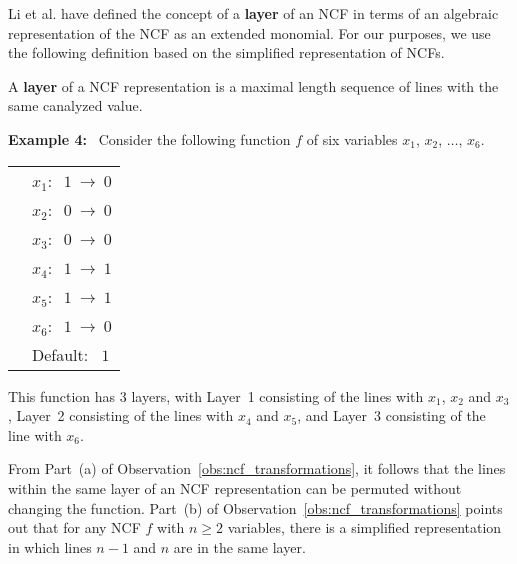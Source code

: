 \noindent
Li et al. \cite{Li-etal-2013} have defined the concept of a 
{\bf layer} of an NCF in terms of
an algebraic representation of the NCF as an extended monomial.
For our purposes, we use the following definition based on the
simplified representation of NCFs.

\begin{definition}
\label{def:layer}
A {\bf layer} of a NCF representation is a maximal length sequence 
of lines with the same canalyzed value.
\end{definition}

\noindent
\textbf{Example 4:}~ Consider the following function $f$ of six variables
$x_1$, $x_2$, $\ldots$, $x_6$. 

\bigskip

\noindent
\begin{tabular}{ll}
\hspace*{1.1in} & $x_1:~$  $1 ~\longrightarrow~ 0$ \\ [0.5ex]
\hspace*{1.1in} & $x_2:~$  $0 ~\longrightarrow~ 0$ \\ [0.5ex]
\hspace*{1.1in} & $x_3:~$  $0 ~\longrightarrow~ 0$ \\ [0.5ex]
\hspace*{1.1in} & $x_4:~$  $1 ~\longrightarrow~ 1$ \\ [0.5ex]
\hspace*{1.1in} & $x_5:~$  $1 ~\longrightarrow~ 1$ \\ [0.5ex]
\hspace*{1.1in} & $x_6:~$  $1 ~\longrightarrow~ 0$ \\ [0.5ex]
\hspace*{1.1in} & Default:~ $1$ \\
\end{tabular}

\medskip
\noindent
This function has 3 layers, with 
Layer~1 consisting of the lines with $x_1$, $x_2$ and $x_3$, 
Layer~2 consisting of the lines with $x_4$ and $x_5$, and
Layer~3 consisting of the line with $x_6$.  %

\medskip
From Part~(a) of Observation~\ref{obs:ncf_transformations},
it follows that the lines within the same layer of an NCF
representation can be permuted without changing the function.
Part~(b) of Observation~\ref{obs:ncf_transformations} points
out that for any NCF $f$ with $n \geq 2$ variables, there is a simplified 
representation in which lines $n-1$ and $n$ are in the same layer.

